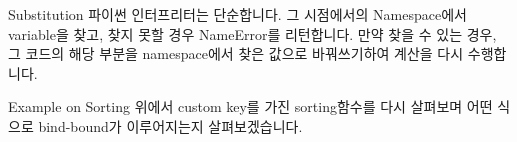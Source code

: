 \documentclass{beamer}
\begin{document}
\begin{frame}[fragile]{Substitution}
파이썬 인터프리터는 단순합니다. 그 시점에서의 Namespace에서 variable을 찾고, 찾지 못할 경우 NameError를 리턴합니다. 만약 찾을 수 있는 경우, 그 코드의 해당 부분을 namespace에서 찾은 값으로 바꿔쓰기하여 계산을 다시 수행합니다. 
\end{frame}

\begin{frame}[fragile]{Example on Sorting}
위에서 custom key를 가진 sorting함수를 다시 살펴보며 어떤 식으로 bind-bound가 이루어지는지 살펴보겠습니다. 
\end{frame}
\end{document}
